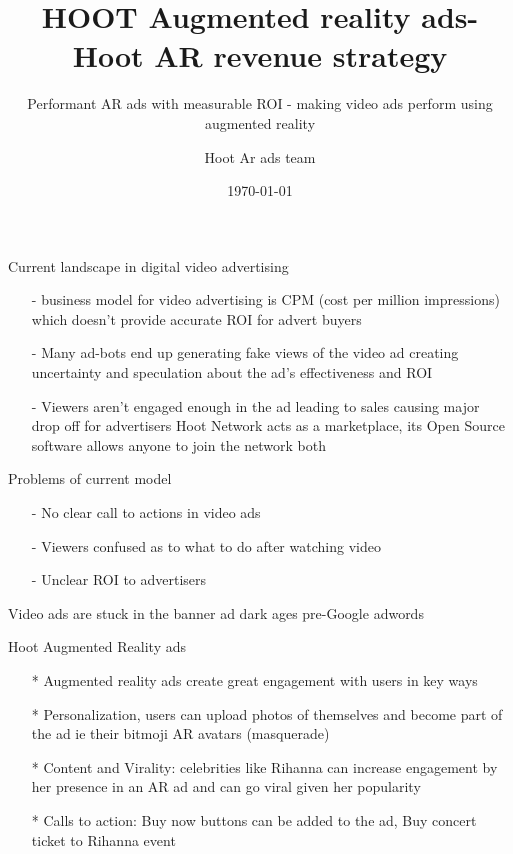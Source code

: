 \documentclass[10pt]{beamer}
\title{HOOT Augmented reality ads- Hoot AR revenue strategy}
\subtitle{Performant AR ads with measurable ROI  - making video ads perform using augmented reality}
\date{\today}
\author{Hoot Ar ads team}
\institute{Hoot Live inc., a Delaware C-corp}
\begin{document}
\maketitle



\begin{frame}[fragile]{Current landscape in digital video advertising }

\begin{itemize}
\item[-]business model for video advertising is CPM (cost per million impressions) which doesn’t provide accurate ROI for advert buyers
  
\item[-]Many ad-bots end up generating fake views of the video ad creating uncertainty and speculation about the ad’s effectiveness and ROI
\item[-]Viewers aren’t engaged enough in the ad leading to sales causing major drop off for advertisers
Hoot Network acts as a marketplace, its Open Source software allows anyone to join the network both 
\end{itemize}

\end{frame}
\begin{frame}[t]{Problems of current model}
\begin{itemize}
\item[-]No clear call to actions in video ads
\item[-]Viewers confused as to what to do after watching video
\item[-]Unclear ROI to advertisers
\end{itemize}

Video ads are stuck in the banner ad dark ages pre-Google adwords 

\end{frame}
\begin{frame}[t]{Hoot Augmented Reality ads }
\begin{itemize}
\item[*]Augmented reality ads create great engagement with users in key ways
\item[*]Personalization, users can upload photos of themselves and become part of the ad ie their  bitmoji AR avatars (masquerade) 
\item[*]Content and Virality: celebrities like Rihanna can increase engagement by her presence in an AR ad and can go viral given her popularity
\item[*]Calls to action: Buy now buttons can be added to the ad, Buy concert ticket to Rihanna event
\end{itemize}
\end{frame}
\end{document}
